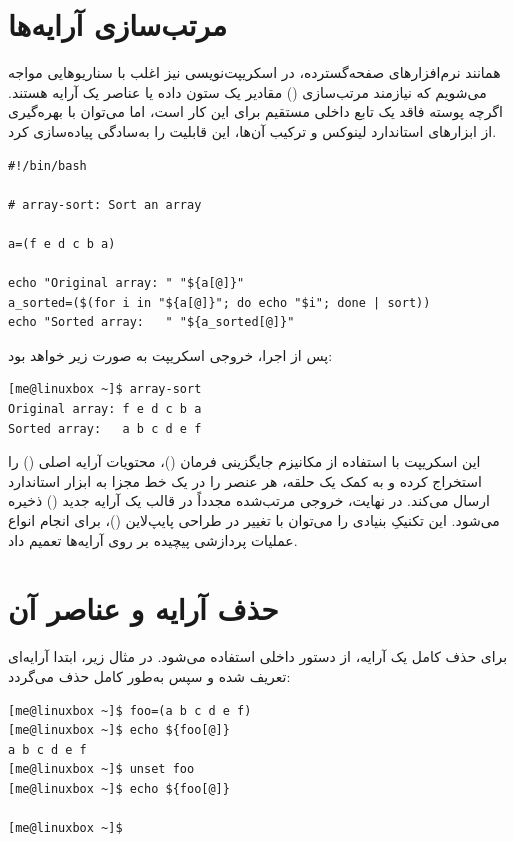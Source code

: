 \section{مرتب‌سازی آرایه‌ها}

همانند نرم‌افزارهای صفحه‌گسترده، در اسکریپت‌نویسی نیز اغلب با سناریوهایی مواجه می‌شویم که نیازمند مرتب‌سازی () مقادیر یک ستون داده یا عناصر یک آرایه هستند. اگرچه پوسته  فاقد یک تابع داخلی مستقیم برای این کار است، اما می‌توان با بهره‌گیری از ابزارهای استاندارد لینوکس و ترکیب آن‌ها، این قابلیت را به‌سادگی پیاده‌سازی کرد.

\begin{latin}
\begin{lstlisting}
#!/bin/bash

# array-sort: Sort an array

a=(f e d c b a)

echo "Original array: " "${a[@]}"
a_sorted=($(for i in "${a[@]}"; do echo "$i"; done | sort))
echo "Sorted array:   " "${a_sorted[@]}"
\end{lstlisting}
\end{latin}

پس از اجرا، خروجی اسکریپت به صورت زیر خواهد بود:

\begin{latin}
\begin{lstlisting}
[me@linuxbox ~]$ array-sort
Original array: f e d c b a
Sorted array:   a b c d e f
\end{lstlisting}
\end{latin}

این اسکریپت با استفاده از مکانیزم جایگزینی فرمان ()، محتویات آرایه اصلی () را استخراج کرده و به کمک یک حلقه، هر عنصر را در یک خط مجزا به ابزار استاندارد  ارسال می‌کند. در نهایت، خروجی مرتب‌شده مجدداً در قالب یک آرایه جدید () ذخیره می‌شود. این تکنیکِ بنیادی را می‌توان با تغییر در طراحی پایپ‌لاین ()، برای انجام انواع عملیات پردازشی پیچیده بر روی آرایه‌ها تعمیم داد.

\section{حذف آرایه و عناصر آن}

برای حذف کامل یک آرایه، از دستور داخلی  استفاده می‌شود. در مثال زیر، ابتدا آرایه‌ای تعریف شده و سپس به‌طور کامل حذف می‌گردد:

\begin{latin}
\begin{lstlisting}
[me@linuxbox ~]$ foo=(a b c d e f)
[me@linuxbox ~]$ echo ${foo[@]}
a b c d e f
[me@linuxbox ~]$ unset foo
[me@linuxbox ~]$ echo ${foo[@]}

[me@linuxbox ~]$
\end{lstlisting}
\end{latin}

